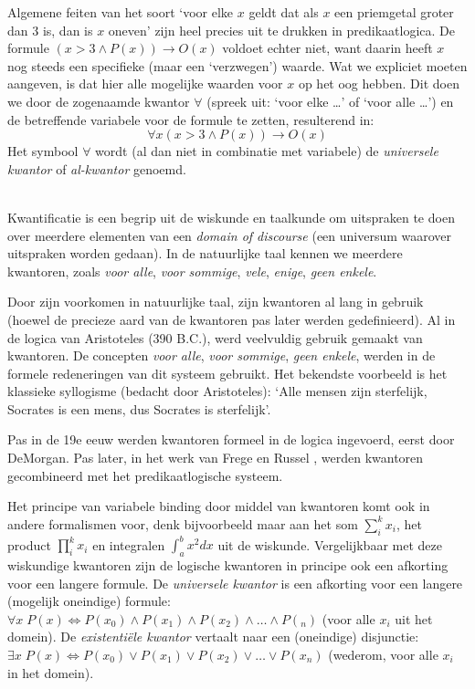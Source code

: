 Algemene feiten van het soort `voor elke $x$ geldt dat als $x$ een priemgetal groter dan 3 is, dan is $x$ oneven' zijn heel precies uit te drukken in predikaatlogica. De formule $(x>3\wedge P(x))\rightarrow O(x)$ voldoet echter niet, want daarin heeft $x$ nog steeds een specifieke (maar een `verzwegen') waarde. Wat we expliciet moeten aangeven, is dat hier alle mogelijke waarden voor $x$ op het oog hebben. Dit doen we door de zogenaamde kwantor $\forall$ (spreek uit: `voor elke \ldots' of `voor alle \ldots') en de betreffende variabele voor de formule te zetten, resulterend in:
$$\forall x(x>3\wedge P(x))\rightarrow O(x)$$
Het symbool $\forall$ wordt (al dan niet in combinatie met variabele) de \textit{universele kwantor} of \textit{al-kwantor} genoemd.

\begin{aside}\mbox{}\\
Kwantificatie is een begrip uit de wiskunde en taalkunde om uitspraken te doen over meerdere elementen van een \textit{domain of discourse} (een universum waarover uitspraken worden gedaan). In de natuurlijke taal kennen we meerdere kwantoren, zoals \textit{voor alle}, \textit{voor sommige}, \textit{vele}, \textit{enige}, \textit{geen enkele}.

Door zijn voorkomen in natuurlijke taal, zijn kwantoren al lang in gebruik (hoewel de precieze aard van de kwantoren pas later werden gedefinieerd). Al in de logica van Aristoteles (390 B.C.), werd veelvuldig gebruik gemaakt van kwantoren. De concepten \textit{voor alle}, \textit{voor sommige}, \textit{geen enkele}, werden in de formele redeneringen van dit systeem gebruikt. Het bekendste voorbeeld is het klassieke syllogisme (bedacht door Aristoteles): `Alle mensen zijn sterfelijk, Socrates is een mens, dus Socrates is sterfelijk'.

Pas in de 19e eeuw werden kwantoren formeel in de logica ingevoerd, eerst door DeMorgan\cite{demorgan}. Pas later, in het werk van Frege \cite{frege:begriffschrift} en Russel \cite{russel:principia:1,russel:principia:2,russel:principia:3}, werden kwantoren gecombineerd met het predikaatlogische systeem.

Het principe van variabele binding door middel van kwantoren komt ook in andere formalismen voor, denk bijvoorbeeld maar aan het som $\sum^k_i x_i$, het product $\prod^k_i x_i$ en integralen $\int_{a}^{b} x^2 dx$ uit de wiskunde. Vergelijkbaar met deze wiskundige kwantoren zijn de logische kwantoren in principe ook een afkorting voor een langere formule. De \textit{universele kwantor} is een afkorting voor een langere (mogelijk oneindige) formule: $\forall x\;P(x) \Leftrightarrow P(x_0)\wedge P(x_1)\wedge P(x_2)\wedge\ldots\wedge P(_n)$ (voor alle $x_i$ uit het domein). De \textit{existenti\"ele kwantor} vertaalt naar een (oneindige) disjunctie: $\exists x\;P(x)\Leftrightarrow P(x_0)\vee P(x_1)\vee P(x_2)\vee\ldots\vee P(x_n)$ (wederom, voor alle $x_i$ in het domein).
\end{aside}


